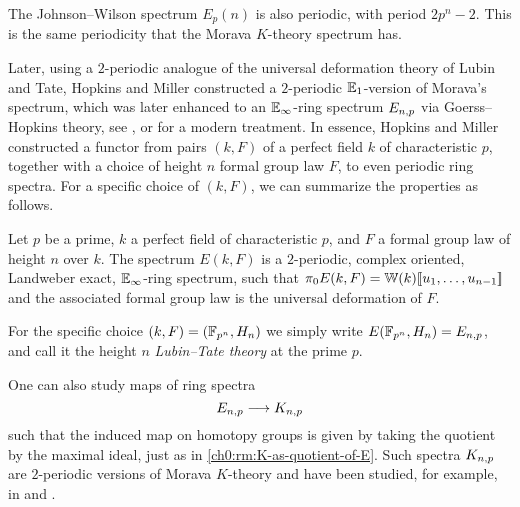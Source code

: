 \begin{remark}
    The Johnson--Wilson spectrum $E_p(n)$ is also periodic, with period $2p^n-2$. This is the same periodicity that the Morava $K$-theory spectrum has. 
\end{remark}

Later, using a $2$-periodic analogue of the universal deformation theory of Lubin and Tate, Hopkins and Miller constructed a $2$-periodic $\mathbb{E}_1$-version of Morava's spectrum, which was later enhanced to an $\mathbb{E}_\infty$-ring spectrum $E_{n,p}$ via Goerss--Hopkins theory, see \cite{goerss-hopkins_04}, or \cite{pstragowski_vankoughnett_2022} for a modern treatment. In essence, Hopkins and Miller constructed a functor from pairs $(k, F)$ of a perfect field $k$ of characteristic $p$, together with a choice of height $n$ formal group law $F$, to even periodic ring spectra. For a specific choice of $(k, F)$, we can summarize the properties as follows.  

\begin{proposition}
    Let $p$ be a prime, $k$ a perfect field of characteristic $p$, and $F$ a formal group law of height $n$ over $k$. The spectrum $E(k,F)$ is a $2$-periodic, complex oriented, Landweber exact, $\mathbb{E}_\infty$-ring spectrum, such that $\pi_0 E(k,F)=\mathbb{W}(k)[\![ u_1, \ldots, u_{n-1}]\!]$ and the associated formal group law is the universal deformation of $F$. 
\end{proposition}




\begin{definition}
    For the specific choice $(k,F) = (\mathbb{F}_{p^n}, H_n)$ we simply write $E(\mathbb{F}_{p^n}, H_n) = E_{n,p}$, and call it the height $n$ \emph{Lubin--Tate theory} at the prime $p$. 
\end{definition}

\begin{remark}
    One can also study maps of ring spectra 
    \[E_{n,p} \longrightarrow K_{n,p}\] 
    such that the induced map on homotopy groups is given by taking the quotient by the maximal ideal, just as in \cref{ch0:rm:K-as-quotient-of-E}. Such spectra $K_{n,p}$ are $2$-periodic versions of Morava $K$-theory and have been studied, for example, in \cite{hopkins-lurie_17} and \cite{barthel-pstragowski_2021}. 
\end{remark}


